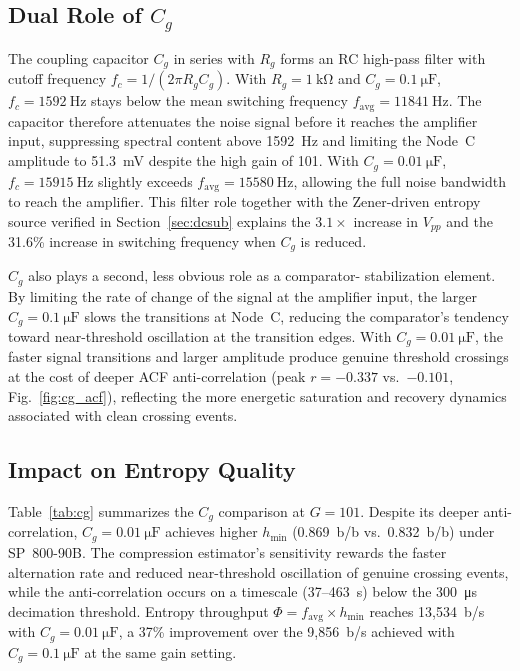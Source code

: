 \documentclass[conference]{IEEEtran}
\newcommand{\hmin}{\ensuremath{h_{\min}}}
\newcommand{\favg}{\ensuremath{f_{\mathrm{avg}}}}
\newcommand{\Cg}{\ensuremath{C_g}}
\newcommand{\Rg}{\ensuremath{R_g}}
\begin{document}
\subsection{Dual Role of $\Cg$}

The coupling capacitor $\Cg$ in series with $\Rg$ forms an RC
high-pass filter with cutoff frequency $f_c=1/(2\pi \Rg \Cg)$. With
$\Rg=\SI{1}{\kilo\ohm}$ and $\Cg=\SI{0.1}{\micro\farad}$, $f_c=\SI{1592}{\hertz}$ stays below the mean switching frequency $\favg=\SI{11841}{\hertz}$. The capacitor therefore attenuates the
noise signal before it reaches the amplifier input, suppressing
spectral content above \SI{1592}{\hertz} and limiting the Node~C
amplitude to \SI{51.3}{\milli\volt} despite the high gain of 101.
With $\Cg=\SI{0.01}{\micro\farad}$, $f_c=\SI{15915}{\hertz}$
slightly exceeds $\favg=\SI{15580}{\hertz}$, allowing the full noise
bandwidth to reach the amplifier. This filter role together with the Zener-driven entropy source verified in Section~\ref{sec:dcsub} explains the
$3.1\times$ increase in $V_{pp}$ and the 31.6\% increase in switching
frequency when $\Cg$ is reduced.

$\Cg$ also plays a second, less obvious role as a comparator-%
stabilization element. By limiting the rate of change of the signal
at the amplifier input, the larger $\Cg=\SI{0.1}{\micro\farad}$ slows
the transitions at Node~C, reducing the comparator's tendency toward
  near-threshold oscillation at the transition edges. With
$\Cg=\SI{0.01}{\micro\farad}$, the faster signal transitions and
larger amplitude produce genuine threshold crossings at the cost of
deeper ACF anti-correlation (peak $r=-0.337$ vs.\ $-0.101$,
Fig.~\ref{fig:cg_acf}), reflecting the more energetic saturation
and recovery dynamics associated with clean crossing events.

\subsection{Impact on Entropy Quality}

Table~\ref{tab:cg} summarizes the $\Cg$ comparison at $G=101$.
Despite its deeper anti-correlation,
$\Cg=\SI{0.01}{\micro\farad}$ achieves higher $\hmin$
(0.869~b/b vs.\ 0.832~b/b) under SP~800-90B. The compression estimator's sensitivity rewards the faster alternation rate and reduced near-threshold oscillation of genuine crossing events, while the anti-correlation occurs on a timescale (37--463~\textmu{}s) below the \SI{300}{\micro\second} decimation threshold. Entropy throughput $\Phi=\favg\!\times\!\hmin$ reaches
13{,}534~b/s with $\Cg=\SI{0.01}{\micro\farad}$, a 37\% improvement
over the 9{,}856~b/s achieved with $\Cg=\SI{0.1}{\micro\farad}$ at
the same gain setting.
\end{document}
